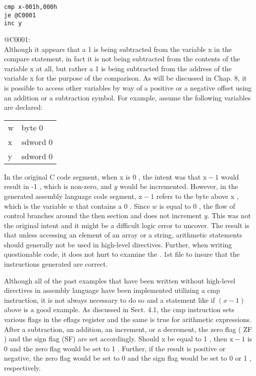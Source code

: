 \documentclass[10pt]{article}
\begin{document}
\begin{verbatim}
cmp x-001h,000h
je @C0001
inc y
\end{verbatim}

@C0001:\\
Although it appears that a 1 is being subtracted from the variable x in the compare statement, in fact it is not being subtracted from the contents of the variable x at all, but rather a 1 is being subtracted from the address of the variable x for the purpose of the comparison. As will be discussed in Chap. 8, it is possible to access other variables by way of a positive or a negative offset using an addition or a subtraction symbol. For example, assume the following variables are declared:

\begin{center}
\begin{tabular}{ll}
w & byte 0 \\
x & sdword 0 \\
y & sdword 0 \\
\end{tabular}
\end{center}

In the original C code segment, when x is 0 , the intent was that $\mathrm{x}-1$ would result in -1 , which is non-zero, and $y$ would be incremented. However, in the generated assembly language code segment, $\mathrm{x}-1$ refers to the byte above x , which is the variable $w$ that contains a 0 . Since $w$ is equal to 0 , the flow of control branches around the then section and does not increment $y$. This was not the original intent and it might be a difficult logic error to uncover. The result is that unless accessing an element of an array or a string, arithmetic statements should generally not be used in high-level directives. Further, when writing questionable code, it does not hurt to examine the . 1st file to insure that the instructions generated are correct.

Although all of the past examples that have been written without high-level directives in assembly language have been implemented utilizing a cmp instruction, it is not always necessary to do so and a statement like if $(x-1)$ above is a good example. As discussed in Sect. 4.1, the cmp instruction sets various flags in the eflags register and the same is true for arithmetic expressions. After a subtraction, an addition, an increment, or a decrement, the zero flag ( ZF ) and the sign flag (SF) are set accordingly. Should x be equal to 1 , then $\mathrm{x}-1$ is 0 and the zero flag would be set to 1 . Further, if the result is positive or negative, the zero flag would be set to 0 and the sign flag would be set to 0 or 1 , respectively.
\end{document}
